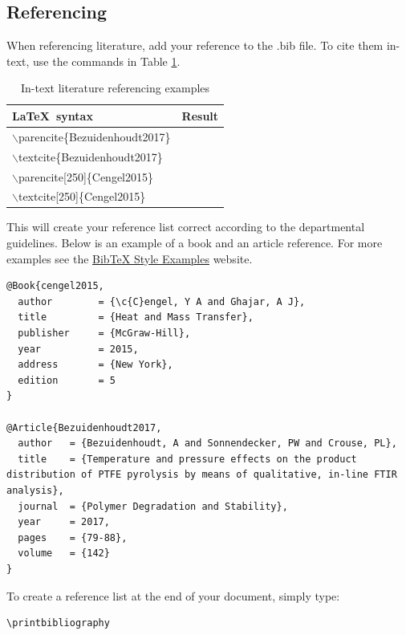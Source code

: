 \subsection{Referencing}

When referencing literature, add your reference to the .bib file. To cite them in-text, use the commands in Table \ref{tab:Cite}.

\begin{table}[!ht]
\centering
\caption{In-text literature referencing examples}
\label{tab:Cite}
    \begin{tabular}{ll}
        \toprule
        \LaTeX\ syntax & Result\\
        \midrule
        $\backslash$parencite\{Bezuidenhoudt2017\} &\parencite{Bezuidenhoudt2017} \\
        $\backslash$textcite\{Bezuidenhoudt2017\} & \textcite{Bezuidenhoudt2017} \\
        $\backslash$parencite[250]\{Cengel2015\} &\parencite[250]{Cengel2015} \\
        $\backslash$textcite[250]\{Cengel2015\} & \textcite[250]{Cengel2015} \\
        \bottomrule
    \end{tabular}
\end{table}

This will create your reference list correct according to the departmental guidelines. Below is an example of a book and an article reference. For more examples see the \href{https://www.verbosus.com/bibtex-style-examples.html}{BibTeX Style Examples} website. 

\begin{lstlisting}
@Book{cengel2015,
  author		= {\c{C}engel, Y A and Ghajar, A J},
  title			= {Heat and Mass Transfer},
  publisher		= {McGraw-Hill},
  year			= 2015,
  address		= {New York},
  edition		= 5
}

@Article{Bezuidenhoudt2017,
  author   = {Bezuidenhoudt, A and Sonnendecker, PW and Crouse, PL},
  title	   = {Temperature and pressure effects on the product distribution of PTFE pyrolysis by means of qualitative, in-line FTIR analysis},
  journal  = {Polymer Degradation and Stability},
  year	   = 2017,
  pages	   = {79-88},
  volume   = {142}
}
\end{lstlisting}

To create a reference list at the end of your document, simply type: 
\begin{lstlisting}
\printbibliography
\end{lstlisting} 
\nocite{*}